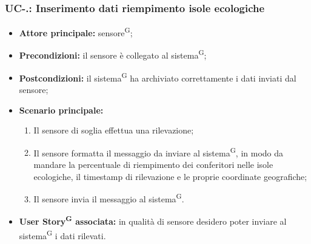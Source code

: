 \documentclass[8pt]{article}
\newcommand{\glossterm}[1]{#1\textsuperscript{G}} %
\begin{document}
\subsubsection*{UC-\theuc .\speconenumber: Inserimento dati riempimento isole ecologiche}
\begin{itemize}
    \item \textbf{Attore principale:} \glossterm{sensore};
    \item \textbf{Precondizioni:} il sensore è collegato al \glossterm{sistema};
    \item \textbf{Postcondizioni:} il \glossterm{sistema} ha archiviato correttamente i dati inviati dal sensore;
    \item \textbf{Scenario principale:}
        \begin{enumerate}
        \item Il sensore di soglia effettua una rilevazione;
        \item Il sensore formatta il messaggio da inviare al \glossterm{sistema}, in modo da mandare la percentuale di riempimento dei conferitori nelle isole ecologiche, il timestamp di rilevazione e le proprie coordinate geografiche;
        \item Il sensore invia il messaggio al \glossterm{sistema}.
        \end{enumerate}
    \item \textbf{\glossterm{User Story} associata:} in qualità di sensore desidero poter inviare al \glossterm{sistema} i dati rilevati.
\end{itemize}
\end{document}
